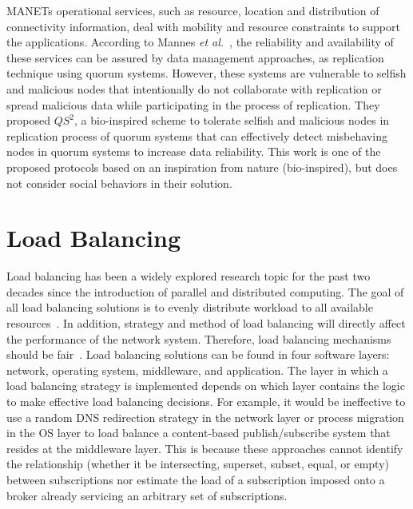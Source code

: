 MANETs operational services, such as resource, location and distribution of connectivity information, deal with mobility and resource constraints to support the applications. According to Mannes {\it et al.}~\cite{EMannes2012}, the reliability and availability of these services can be assured by data management approaches, as replication technique using quorum systems. However, these systems are vulnerable to selfish and malicious nodes that intentionally do not collaborate with replication or spread malicious data while participating in the process of replication. They proposed $QS^2$, a bio-inspired scheme to tolerate selfish and malicious nodes in replication process of quorum systems that can effectively detect misbehaving nodes in quorum systems to increase data reliability. This work is one of the proposed protocols based on an inspiration from nature (bio-inspired), but does not consider social behaviors in their solution.

\section{Load Balancing}\label{Chap2_05}
Load balancing has been a widely explored research topic for the past two decades since the introduction of parallel and distributed computing. The goal of all load balancing solutions is to evenly distribute workload to all available resources~\cite{YZhu2013}\cite{JBalasangameshwara2013}. In addition, strategy and method of load balancing will directly affect the performance of the network system. Therefore, load balancing mechanisms should be fair~\cite{JBalasangameshwara2013}. Load balancing solutions can be found in four software layers: network, operating system, middleware, and application. The layer in which a load balancing strategy is implemented depends on which layer contains the logic to make effective load balancing decisions. For example, it would be ineffective to use a random DNS redirection strategy in the network layer or process migration in the OS layer to load balance a content-based publish/subscribe system that resides at the middleware layer. This is because these approaches cannot identify the relationship (whether it be intersecting, superset, subset, equal, or empty) between subscriptions nor estimate the load of a subscription imposed onto a broker already servicing an arbitrary set of subscriptions.

